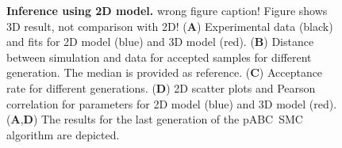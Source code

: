 \documentclass[10pt,letterpaper]{article}
\newcommand{\nj}[1]{{\color{blue}#1}}
\begin{document}
\begin{figure}[p]
\begin{adjustwidth}{-2in}{0in} %
\vspace*{0.5cm}
\caption{{\bf Inference using 2D model.} \nj{wrong figure caption! Figure shows 3D result, not comparison with 2D!}
(\textbf{A}) Experimental data (black) and fits for 2D model (blue) and 3D model (red).
(\textbf{B}) Distance between simulation and data for accepted samples for different generation. The median is provided as reference. 
(\textbf{C}) Acceptance rate for different generations.
(\textbf{D}) 2D scatter plots and Pearson correlation for parameters for 2D model (blue) and 3D model (red). 
(\textbf{A},\textbf{D}) The results for the last generation of the pABC~SMC algorithm are depicted.
}
\label{fig: fitting of 2D model to experimental data for case without nutrition limitation}
\end{adjustwidth}
\end{figure}
\end{document}

